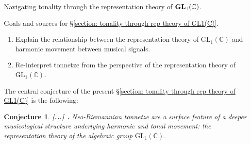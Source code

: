 \documentclass[letterpaper,11pt, reqno]{amsart}
\newtheorem{monodromy theorem}{Monodromy Theorem}[subsection]
\newtheorem{wild conjecture}[theorem]{Wild Conjecture}
\newtheorem{research objectives}{Research objectives}[subsection]
\newtheorem{research question}[theorem]{Research questions}
\newtheorem{aside question}[theorem]{Aside question}
\newtheorem{conjecture}[theorem]{Conjecture}
\newtheorem{audio example}[theorem]{\loudspeaker[3] Example}
\newtheorem{blank remark}[theorem]{}
\newtheorem{terminology and comment}[theorem]{Terminology and comment}
\newtheorem{purity hypothesis}[theorem]{Purity hypothesis}
\newtheorem{corollary of the purity hypothesis}[theorem]{Corollary of the purity hypothesis}
\newcommand{\CC} {{\mathbb C}}
\numberwithin{equation}{theorem}
\begin{document}
\begin{section}{Navigating tonality through the representation theory of $\bold{GL}_{1}(\CC)$.}
\begin{subsection}{Goals and sources for \S\ref{section: tonality through rep theory of GL1(C)}.}
\begin{enumerate}[{\bf\ \ \ \ \ \ $\bullet$}]
	\item
	Explain the relationship between the representation theory of $\text{GL}_{1}(\CC)$ and harmonic movement between musical signals.
	\item
	Re-interpret tonnetze from the perspective of the representation theory of $\text{GL}_{1}(\CC)$.
	\end{enumerate}
The central conjecture of the present \S\ref{section: tonality through rep theory of GL1(C)} is the following:
	\begin{conjecture}
	{\bf {\color{red} [...]} .}
	\normalfont
	Neo-Riemannian tonnetze are a surface feature of a deeper musicological structure underlying harmonic and tonal movement: the representation theory of the algebraic group $\text{GL}_{1}(\CC)$.
	\end{conjecture}

	
\end{subsection}


\end{section}
\end{document}
